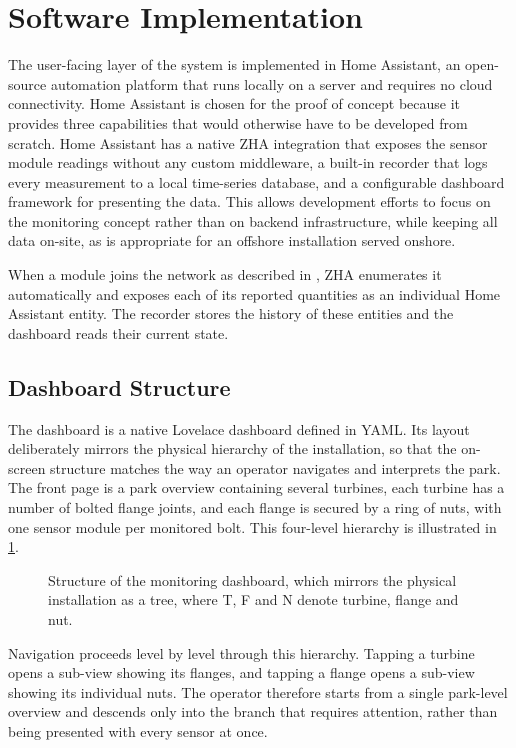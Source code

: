 \section{Software Implementation} \label{sec:Software_imp}

The user-facing layer of the system is implemented in Home Assistant, an open-source automation platform that runs locally on a server and requires no cloud connectivity. Home Assistant is chosen for the proof of concept because it provides three capabilities that would otherwise have to be developed from scratch. Home Assistant has a native ZHA integration that exposes the sensor module readings without any custom middleware, a built-in recorder that logs every measurement to a local time-series database, and a configurable dashboard framework for presenting the data. This allows development efforts to focus on the monitoring concept rather than on backend infrastructure, while keeping all data on-site, as is appropriate for an offshore installation served onshore.

When a module joins the network as described in , ZHA enumerates it automatically and exposes each of its reported quantities as an individual Home Assistant entity. The recorder stores the history of these entities and the dashboard reads their current state.

\subsection{Dashboard Structure}
The dashboard is a native Lovelace dashboard defined in YAML. Its layout deliberately mirrors the physical hierarchy of the installation, so that the on-screen structure matches the way an operator navigates and interprets the park. The front page is a park overview containing several turbines, each turbine has a number of bolted flange joints, and each flange is secured by a ring of nuts, with one sensor module per monitored bolt. This four-level hierarchy is illustrated in \cref{fig:gui_hierarchy}.

\begin{figure}[!b]
\centering

    \caption{Structure of the monitoring dashboard, which mirrors the physical installation as a tree, where T, F and N denote turbine, flange and nut.}
    \label{fig:gui_hierarchy}
\end{figure}

Navigation proceeds level by level through this hierarchy. Tapping a turbine opens a sub-view showing its flanges, and tapping a flange opens a sub-view showing its individual nuts. The operator therefore starts from a single park-level overview and descends only into the branch that requires attention, rather than being presented with every sensor at once.

